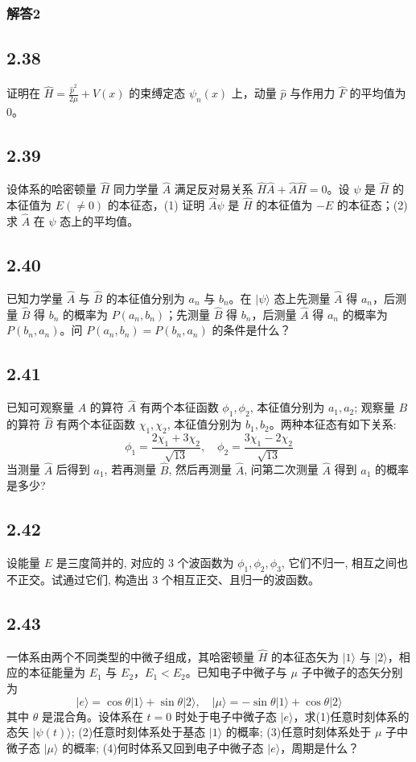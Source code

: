 \subsubsection{解答2}


\newpage
\subsection{2.38}
证明在 $\hat{H} = \frac{\hat{p}^2}{2\mu} + V(x)$ 的束缚定态 $\psi_n (x)$ 上，动量 $\hat{p}$ 与作用力 $\hat{F}$ 的平均值为0。

\subsection{2.39}
设体系的哈密顿量 $\hat{H}$ 同力学量 $\hat{A}$ 满足反对易关系 $\hat{H} \hat{A} + \hat{A} \hat{H} = 0$。设 $\psi$ 是 $\hat{H}$ 的本征值为 $E(\neq 0)$ 的本征态，(1) 证明 $\hat{A} \psi$ 是 $\hat{H}$ 的本征值为 $-E$ 的本征态；(2) 求 $\hat{A}$ 在 $\psi$ 态上的平均值。

\subsection{2.40}
已知力学量 $\hat{A}$ 与 $\hat{B}$ 的本征值分别为 $a_n$ 与 $b_n$。在 $|\psi\rangle$ 态上先测量 $\hat{A}$ 得 $a_n$，后测量 $\hat{B}$ 得 $b_n$ 的概率为 $P(a_n, b_n)$；先测量 $\hat{B}$ 得 $b_n$，后测量 $\hat{A}$ 得 $a_n$ 的概率为 $P(b_n, a_n)$。问 $P(a_n, b_n) = P(b_n, a_n)$ 的条件是什么？

\subsection{2.41}
已知可观察量 $A$ 的算符 $\hat{A}$ 有两个本征函数 $\phi_1, \phi_2$, 本征值分别为 $a_1, a_2$; 观察量 $B$ 的算符 $\hat{B}$ 有两个本征函数 $\chi_1, \chi_2$, 本征值分别为 $b_1, b_2$。两种本征态有如下关系:
$$\phi_1 = \frac{2\chi_1 + 3\chi_2}{\sqrt{13}}, \quad \phi_2 = \frac{3\chi_1 - 2\chi_2}{\sqrt{13}}$$
当测量 $\hat{A}$ 后得到 $a_1$, 若再测量 $\hat{B}$, 然后再测量 $\hat{A}$, 问第二次测量 $\hat{A}$ 得到 $a_1$ 的概率是多少?

\subsection{2.42}
设能量 $E$ 是三度简并的, 对应的 3 个波函数为 $\phi_1, \phi_2, \phi_3$, 它们不归一, 相互之间也不正交。试通过它们, 构造出 3 个相互正交、且归一的波函数。

\subsection{2.43}
一体系由两个不同类型的中微子组成，其哈密顿量 $\hat{H}$ 的本征态矢为 $|1\rangle$ 与 $|2\rangle$，相应的本征能量为 $E_1$ 与 $E_2$，$E_1 < E_2$。已知电子中微子与 $\mu$ 子中微子的态矢分别为
$$|e\rangle = \cos \theta |1\rangle + \sin \theta |2\rangle, \quad |\mu\rangle = -\sin \theta |1\rangle + \cos \theta |2\rangle$$
其中 $\theta$ 是混合角。设体系在 $t=0$ 时处于电子中微子态 $|e\rangle$，求(1)任意时刻体系的态矢 $|\psi(t)\rangle$; (2)任意时刻体系处于基态 $|1\rangle$ 的概率; (3)任意时刻体系处于 $\mu$ 子中微子态 $|\mu\rangle$ 的概率; (4)何时体系又回到电子中微子态 $|e\rangle$，周期是什么？

